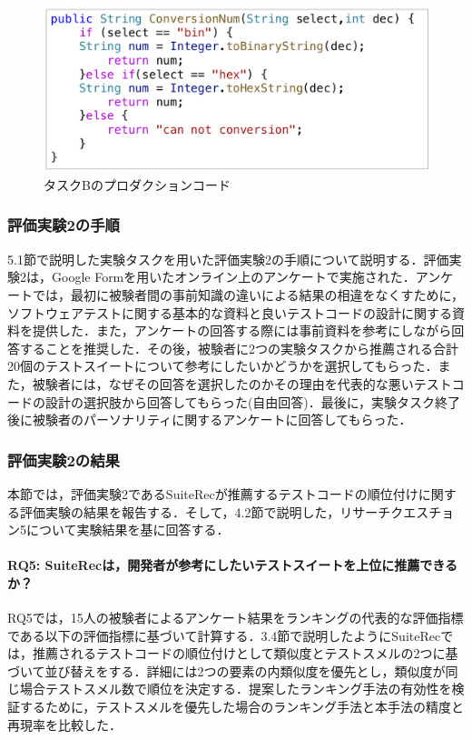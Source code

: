 \documentclass[12pt]{jarticle} %
\begin{document}
\begin{description}
\begin{figure}[htbp]
  \begin{center}
    \includegraphics[clip,width=12cm]{taskB.pdf}
    \caption{タスクBのプロダクションコード}
    \label{E2}
  \end{center}
\end{figure}

\end{description}

\subsubsection{評価実験2の手順}

5.1節で説明した実験タスクを用いた評価実験2の手順について説明する．評価実験2は，Google Formを用いたオンライン上のアンケートで実施された．アンケートでは，最初に被験者間の事前知識の違いによる結果の相違をなくすために，ソフトウェアテストに関する基本的な資料と良いテストコードの設計に関する資料を提供した．また，アンケートの回答する際には事前資料を参考にしながら回答することを推奨した．その後，被験者に2つの実験タスクから推薦される合計20個のテストスイートについて参考にしたいかどうかを選択してもらった．また，被験者には，なぜその回答を選択したのかその理由を代表的な悪いテストコードの設計の選択肢から回答してもらった(自由回答)．最後に，実験タスク終了後に被験者のパーソナリティに関するアンケートに回答してもらった．

\subsubsection{評価実験2の結果}

本節では，評価実験2である{\sf SuiteRec}が推薦するテストコードの順位付けに関する評価実験の結果を報告する．そして，4.2節で説明した，リサーチクエスチョン5について実験結果を基に回答する．

\paragraph{RQ5: SuiteRecは，開発者が参考にしたいテストスイートを上位に推薦できるか？}
RQ5では，15人の被験者によるアンケート結果をランキングの代表的な評価指標である以下の評価指標に基づいて計算する．3.4節で説明したようにSuiteRecでは，推薦されるテストコードの順位付けとして類似度とテストスメルの2つに基づいて並び替えをする．詳細には2つの要素の内類似度を優先とし，類似度が同じ場合テストスメル数で順位を決定する．提案したランキング手法の有効性を検証するために，テストスメルを優先した場合のランキング手法と本手法の精度と再現率を比較した．
\end{document}
